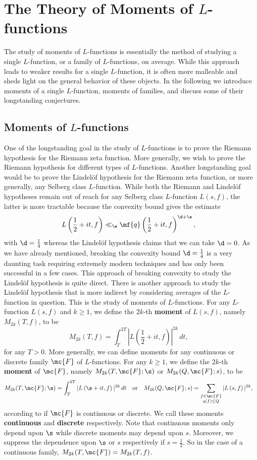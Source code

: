 \chapter{The Theory of Moments of \texorpdfstring{$L$}{L}-functions}
  The study of moments of $L$-functions is essentially the method of studying a single $L$-function, or a family of $L$-functions, on average. While this approach leads to weaker results for a single $L$-function, it is often more malleable and sheds light on the general behavior of these objects. In the following we introduce moments of a single $L$-function, moments of families, and discuss some of their longstanding conjectures.
\section{Moments of \texorpdfstring{$L$}{L}-functions}
  One of the longstanding goal in the study of $L$-functions is to prove the Riemann hypothesis for the Riemann zeta function. More generally, we wish to prove the Riemann hypothesis for different types of $L$-functions. Another longstanding goal would be to prove the Lindel\"of hypothesis for the Riemann zeta function, or more generally, any Selberg class $L$-function. While both the Riemann and Lindel\"of hypotheses remain out of reach for any Selberg class $L$-function $L(s,f)$, the latter is more tractable because the convexity bound gives the estimate
  \[
    L\left(\frac{1}{2}+it,f\right) \ll_{\e} \mf{q}\left(\frac{1}{2}+it,f\right)^{\d+\e},
  \]
  with $\d = \frac{1}{4}$ whereas the Lindel\"of hypothesis claims that we can take $\d = 0$. As we have already mentioned, breaking the convexity bound $\d = \frac{1}{4}$ is a very daunting task requiring extremely modern techniques and has only been successful in a few cases. This approach of breaking convexity to study the Lindel\"of hypothesis is quite direct. There is another approach to study the Lindel\"of hypothesis that is more indirect by considering averages of the $L$-function in question. This is the study of moments of $L$-functions. For any $L$-function $L(s,f)$ and $k \ge 1$, we define the $2k$-th \textbf{moment} of $L(s,f)$, namely $M_{2k}(T,f)$, to be
  \[
    M_{2k}(T,f) = \int_{T}^{2T}\left|L\left(\frac{1}{2}+it,f\right)\right|^{2k}\,dt,
  \]
  for any $T > 0$. More generally, we can define moments for any continuous or discrete family $\mc{F}$ of $L$-functions. For any $k \ge 1$, we define the $2k$-th \textbf{moment} of $\mc{F}$, namely $M_{2k}(T,\mc{F};\s)$ or $M_{2k}(Q,\mc{F};s)$, to be
  \[
    M_{2k}(T,\mc{F};\s) = \int_{T}^{2T}|L\left(\s+it,f\right)|^{2k}\,dt \quad \text{or} \quad M_{2k}(Q,\mc{F};s) = \sum_{\substack{f \in \mc{F} \\ q(f) \le Q}}|L\left(s,f\right)|^{2k},
  \]
  according to if $\mc{F}$ is continuous or discrete. We call these moments \textbf{continuous} and \textbf{discrete} respectively. Note that continuous moments only depend upon $\s$ while discrete moments may depend upon $s$. Moreover, we suppress the dependence upon $\s$ or $s$ respectively if $s = \frac{1}{2}$. So in the case of a continuous family, $M_{2k}(T,\mc{F}) = M_{2k}(T,f)$.

